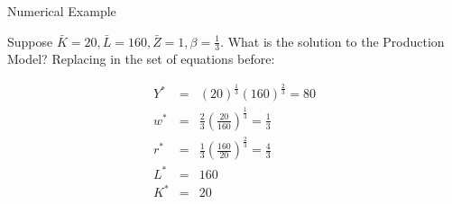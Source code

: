 \documentclass[notes,11pt, aspectratio=169, xcolor=table]{beamer}
\begin{document}
\begin{frame}{Numerical Example}

Suppose $\bar{K} = 20, \bar{L} = 160, \bar{Z}=1, \beta=\frac{1}{3}$. What is the solution to the Production Model? Replacing in the set of equations before:

  \begin{eqnarray*}
    Y^* &=&  (20)^{\frac{1}{3}}  (160)^{\frac{2}{3}} = 80 \\
    w^* &=& \frac{2}{3} \left( \frac{20}{160} \right)^{\frac{1}{3}} = \frac{1}{3} \\
     r^* &=&  \frac{1}{3} \left( \frac{160}{20} \right)^{\frac{2}{3}} = \frac{4}{3}  \\
     L^* &=& 160  \\
     K^* &=& 20
  \end{eqnarray*}
\end{frame}
\end{document}
